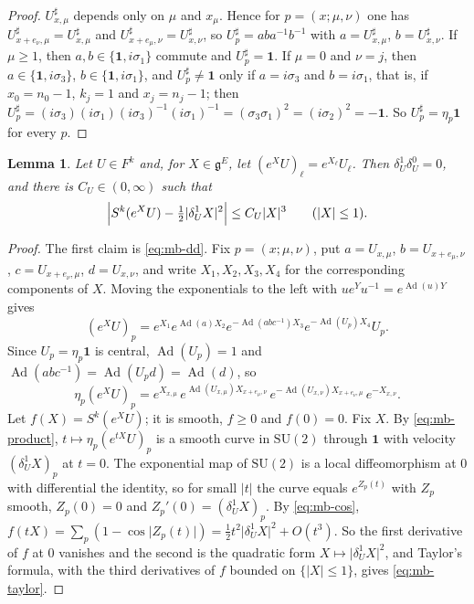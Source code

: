 \documentclass[11pt,a4paper]{amsart}
\newtheorem{lemma}[theorem]{Lemma}
\theoremstyle{definition}
\theoremstyle{remark}
\numberwithin{equation}{section}
\newcommand{\abs}[1]{\lvert #1\rvert}      %
\newcommand{\SU}{\mathrm{SU}}              %
\begin{document}
\begin{proof}
$U^\sharp_{x,\mu}$ depends only on $\mu$ and $x_\mu$. Hence for $p=(x;\mu,\nu)$ one has $U^\sharp_{x+e_\nu,\mu}=U^\sharp_{x,\mu}$ and $U^\sharp_{x+e_\mu,\nu}=U^\sharp_{x,\nu}$, so $U^\sharp_p=aba^{-1}b^{-1}$ with $a=U^\sharp_{x,\mu}$, $b=U^\sharp_{x,\nu}$. If $\mu\ge1$, then $a,b\in\{\mathbf 1,i\sigma_1\}$ commute and $U^\sharp_p=\mathbf 1$. If $\mu=0$ and $\nu=j$, then $a\in\{\mathbf 1,i\sigma_3\}$, $b\in\{\mathbf 1,i\sigma_1\}$, and $U^\sharp_p\ne\mathbf 1$ only if $a=i\sigma_3$ and $b=i\sigma_1$, that is, if $x_0=n_0-1$, $k_j=1$ and $x_j=n_j-1$; then $U^\sharp_p=(i\sigma_3)(i\sigma_1)(i\sigma_3)^{-1}(i\sigma_1)^{-1}=(\sigma_3\sigma_1)^2=(i\sigma_2)^2=-\mathbf 1$. So $U^\sharp_p=\eta_p\mathbf 1$ for every $p$.
\end{proof}

\begin{lemma}\label{lem:mb-hessian}
Let $U\in F^k$ and, for $X\in\mathfrak g^E$, let $(e^XU)_\ell=e^{X_\ell}U_\ell$. Then $\delta^1_U\delta^0_U=0$, and there is $C_U\in(0,\infty)$ such that
\begin{equation}\label{eq:mb-taylor}
\Bigl|S^k(e^XU)-\tfrac12\abs{\delta^1_UX}^2\Bigr|\le C_U\abs X^3\qquad(\abs X\le1).
\end{equation}
\end{lemma}

\begin{proof}
The first claim is \eqref{eq:mb-dd}. Fix $p=(x;\mu,\nu)$, put $a=U_{x,\mu}$, $b=U_{x+e_\mu,\nu}$, $c=U_{x+e_\nu,\mu}$, $d=U_{x,\nu}$, and write $X_1,X_2,X_3,X_4$ for the corresponding components of $X$. Moving the exponentials to the left with $ue^Yu^{-1}=e^{\operatorname{Ad}(u)Y}$ gives
\[
(e^XU)_p=e^{X_1}e^{\operatorname{Ad}(a)X_2}e^{-\operatorname{Ad}(abc^{-1})X_3}e^{-\operatorname{Ad}(U_p)X_4}U_p .
\]
Since $U_p=\eta_p\mathbf 1$ is central, $\operatorname{Ad}(U_p)=1$ and $\operatorname{Ad}(abc^{-1})=\operatorname{Ad}(U_pd)=\operatorname{Ad}(d)$, so
\begin{equation}\label{eq:mb-product}
\eta_p(e^XU)_p=e^{X_{x,\mu}}\,e^{\operatorname{Ad}(U_{x,\mu})X_{x+e_\mu,\nu}}\,e^{-\operatorname{Ad}(U_{x,\nu})X_{x+e_\nu,\mu}}\,e^{-X_{x,\nu}}.
\end{equation}
Let $f(X)=S^k(e^XU)$; it is smooth, $f\ge0$ and $f(0)=0$. Fix $X$. By \eqref{eq:mb-product}, $t\mapsto\eta_p(e^{tX}U)_p$ is a smooth curve in $\SU(2)$ through $\mathbf 1$ with velocity $(\delta^1_UX)_p$ at $t=0$. The exponential map of $\SU(2)$ is a local diffeomorphism at $0$ with differential the identity, so for small $\abs t$ the curve equals $e^{Z_p(t)}$ with $Z_p$ smooth, $Z_p(0)=0$ and $Z_p'(0)=(\delta^1_UX)_p$. By \eqref{eq:mb-cos}, $f(tX)=\sum_p(1-\cos\abs{Z_p(t)})=\frac12t^2\abs{\delta^1_UX}^2+O(t^3)$. So the first derivative of $f$ at $0$ vanishes and the second is the quadratic form $X\mapsto\abs{\delta^1_UX}^2$, and Taylor's formula, with the third derivatives of $f$ bounded on $\{\abs X\le1\}$, gives \eqref{eq:mb-taylor}.
\end{proof}
\end{document}
